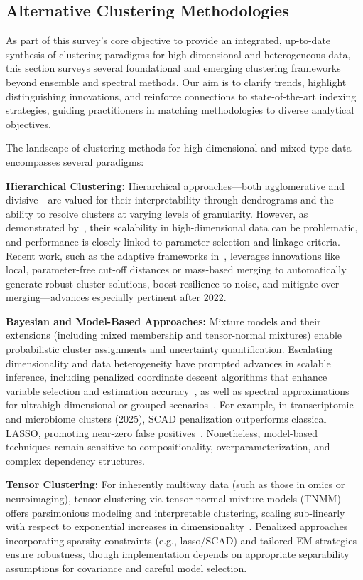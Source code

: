 \documentclass[sigconf]{acmart}
\begin{document}
\subsection{Alternative Clustering Methodologies}

As part of this survey's core objective to provide an integrated, up-to-date synthesis of clustering paradigms for high-dimensional and heterogeneous data, this section surveys several foundational and emerging clustering frameworks beyond ensemble and spectral methods. Our aim is to clarify trends, highlight distinguishing innovations, and reinforce connections to state-of-the-art indexing strategies, guiding practitioners in matching methodologies to diverse analytical objectives.

The landscape of clustering methods for high-dimensional and mixed-type data encompasses several paradigms:

\textbf{Hierarchical Clustering:} Hierarchical approaches---both agglomerative and divisive---are valued for their interpretability through dendrograms and the ability to resolve clusters at varying levels of granularity. However, as demonstrated by~\cite{ref64,ref71}, their scalability in high-dimensional data can be problematic, and performance is closely linked to parameter selection and linkage criteria. Recent work, such as the adaptive frameworks in~\cite{ref16,ref62}, leverages innovations like local, parameter-free cut-off distances or mass-based merging to automatically generate robust cluster solutions, boost resilience to noise, and mitigate over-merging---advances especially pertinent after 2022.

\textbf{Bayesian and Model-Based Approaches:} Mixture models and their extensions (including mixed membership and tensor-normal mixtures) enable probabilistic cluster assignments and uncertainty quantification. Escalating dimensionality and data heterogeneity have prompted advances in scalable inference, including penalized coordinate descent algorithms that enhance variable selection and estimation accuracy~\cite{ref100}, as well as spectral approximations for ultrahigh-dimensional or grouped scenarios~\cite{ref90}. For example, in transcriptomic and microbiome clusters (2025), SCAD penalization outperforms classical LASSO, promoting near-zero false positives~\cite{ref100}. Nonetheless, model-based techniques remain sensitive to compositionality, overparameterization, and complex dependency structures.

\textbf{Tensor Clustering:} For inherently multiway data (such as those in omics or neuroimaging), tensor clustering via tensor normal mixture models (TNMM) offers parsimonious modeling and interpretable clustering, scaling sub-linearly with respect to exponential increases in dimensionality~\cite{ref58}. Penalized approaches incorporating sparsity constraints (e.g., lasso/SCAD) and tailored EM strategies ensure robustness, though implementation depends on appropriate separability assumptions for covariance and careful model selection.
\end{document}
